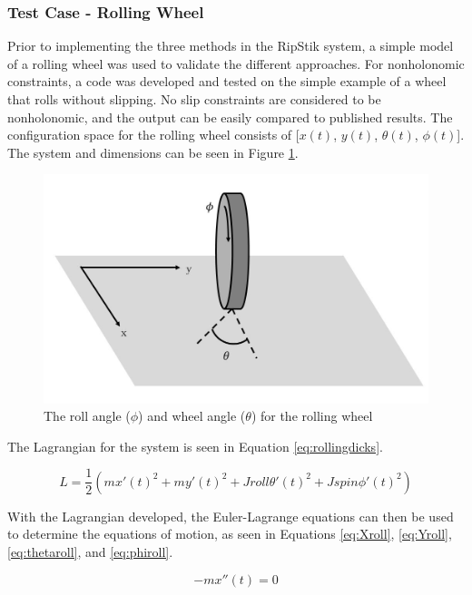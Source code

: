 \subsubsection{Test Case - Rolling Wheel}\label{sec:testcaserw}

Prior to implementing the three methods in the RipStik system, a simple model of a rolling wheel was used to validate the different approaches. For nonholonomic constraints, a code was developed and tested on the simple example of a wheel that rolls without slipping.
No slip constraints are considered to be nonholonomic, and the output can be easily compared to published results.
The configuration space for the rolling wheel consists of [$x(t)$, $y(t)$, $\theta(t)$, $\phi(t)$]. 
The system and dimensions can be seen in Figure \ref{fig:rollwheel}.

\begin{figure}[!htb]
	\centering
	\includegraphics[width=\linewidth]{rollingwheel.JPG}
	\caption{The roll angle ($\phi$) and wheel angle ($\theta$) for the rolling wheel}\label{fig:rollwheel}
	\endminipage
\end{figure}

The Lagrangian for the system is seen in Equation \ref{eq:rollingdicks}.

\begin{equation}
\label{eq:rollingdicks}
L=\frac{1}{2}(mx'(t)^2+my'(t)^2+Jroll\theta'(t)^2+Jspin\phi'(t)^2)
\end{equation}

With the Lagrangian developed, the Euler-Lagrange equations can then be used to determine the equations of motion, as seen in Equations \ref{eq:Xroll}, \ref{eq:Yroll}, \ref{eq:thetaroll}, and \ref{eq:phiroll}.

\begin{equation}
\label{eq:Xroll}
-mx''(t)=0
\end{equation}

